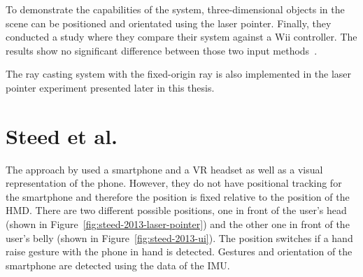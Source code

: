 To demonstrate the capabilities of the system, three-dimensional objects in the scene can be positioned and orientated using the laser pointer. Finally, they conducted a study where they compare their system against a Wii controller. The results show no significant difference between those two input methods~\cite[125]{Pietroszek.2014}.

The ray casting system with the fixed-origin ray is also implemented in the laser pointer experiment presented later in this thesis.%


\section{Steed et al.\@}\label{section:steed-2013}
The approach by \citeauthor{Steed.2013} used a smartphone and a \gls{VR} headset as well as a visual representation of the phone. However, they do not have positional tracking for the smartphone and therefore the position is fixed relative to the position of the \gls{HMD}. There are two different possible positions, one in front of the user's head (shown in Figure~\ref{fig:steed-2013-laser-pointer}) and the other one in front of the user's belly (shown in Figure~\ref{fig:steed-2013-ui}). The position switches if a hand raise gesture with the phone in hand is detected. Gestures and orientation of the smartphone are detected using the data of the \gls{IMU}.

